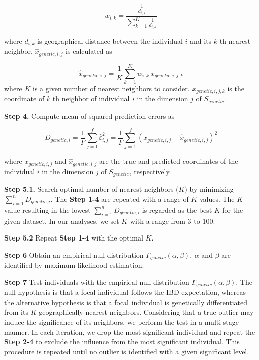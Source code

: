 \documentclass[11pt]{article}
\begin{document}
\begin{equation} \label{w_eq1}
w_{i,k}=\frac{\frac{1}{d_{i,k}}}{\sum_{k=1}^{K} \frac{1}{d_{i,k}}}
\end{equation}

where $d_{i,k}$ is geographical distance between the individual $i$ and its $k$ th nearest neighbor.
$\hat{x}_{genetic,i,j}$ is calculated as

\begin{equation} \label{wknn_eq1}
\hat{x}_{genetic,i,j}=\frac{1}{K}\sum_{k=1}^{K}w_{i,k}\ x_{genetic,i,j,k}
\end{equation}
where $K$ is a given number of nearest neighbors to consider. $x_{genetic,i,j,k}$ is the coordinate of $k$ th neighbor of individual $i$ in the dimension $j$ of $S_{genetic}$.

\textbf{Step 4.} Compute mean of squared prediction errors as

\begin{equation} \label{Dg_eq}
D_{genetic, i}=\frac{1}{F}\sum_{j=1}^{f} \hat{\varepsilon}_{i,j}^2 =\frac{1}{F}\sum_{j=1}^{f} (x_{genetic,i,j} - \hat{x}_{genetic,i,j})^2
\end{equation}

where $x_{genetic,i,j}$ and $\hat{x}_{genetic,i,j}$ are the true and predicted coordinates of the individual $i$ in the dimension $j$ of $S_{genetic}$, respectively.

\textbf{Step 5.1.} Search optimal number of nearest neighbors ($K$) by minimizing $\sum_{i=1}^{n}D_{genetic,i}$. 
The \textbf{Step 1-4} are repeated with a range of $K$ values.
The $K$ value resulting in the lowest $\sum_{i=1}^{n}D_{genetic,i}$ is regarded as the best $K$ for the given dataset.
In our analyses, we set $K$ with a range from 3 to 100.

\textbf{Step 5.2} Repeat \textbf{Step 1-4} with the optimal $K$.

\textbf{Step 6} Obtain an empirical null distribution $\Gamma_{genetic}(\alpha,\beta)$. $\alpha$ and $\beta$ are identified by maximum likelihood estimation.

\textbf{Step 7} Test individuals with the empirical null distribution $\Gamma_{genetic}(\alpha,\beta)$. The null hypothesis is that a focal individual follows the IBD expectation, whereas the alternative hypothesis is that a focal individual is genetically differentiated from its $K$ geographically nearest neighbors.
Considering that a true outlier may induce the significance of its neighbors, we perform the test in a multi-stage manner.
In each iteration, we drop the most significant individual and repeat the \textbf{Step 2-4} to exclude the influence from the most significant individual.
This procedure is repeated until no outlier is identified with a given significant level.
\end{document}
